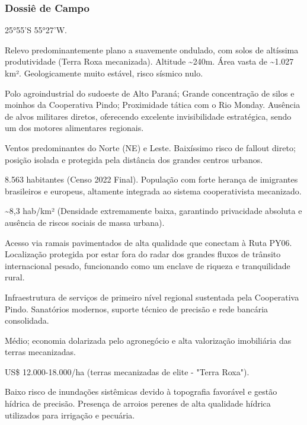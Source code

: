 \subsubsection{Dossiê de Campo}
\begin{description}[style=nextline,leftmargin=0.5cm,font=\bfseries]
\item[Coordenadas]  25°55'S 55°27'W.
\item[Topografia]  Relevo predominantemente plano a suavemente ondulado, com solos de altíssima produtividade (Terra Roxa mecanizada). Altitude \textasciitilde 240m. Área vasta de \textasciitilde 1.027 km². Geologicamente muito estável, risco sísmico nulo.
\item[Alvos Estratégicos]  Polo agroindustrial do sudoeste de Alto Paraná; Grande concentração de silos e moinhos da Cooperativa Pindo; Proximidade tática com o Rio Monday. Ausência de alvos militares diretos, oferecendo excelente invisibilidade estratégica, sendo um dos motores alimentares regionais.
\item[Fallout]  Ventos predominantes do Norte (NE) e Leste. Baixíssimo risco de fallout direto; posição isolada e protegida pela distância dos grandes centros urbanos.
\item[População]  8.563 habitantes (Censo 2022 Final). População com forte herança de imigrantes brasileiros e europeus, altamente integrada ao sistema cooperativista mecanizado.
\item[Densidade]  \textasciitilde 8,3 hab/\allowbreak km² (Densidade extremamente baixa, garantindo privacidade absoluta e ausência de riscos sociais de massa urbana).
\item[Vias de Acesso]  Acesso via ramais pavimentados de alta qualidade que conectam à Ruta PY06. Localização protegida por estar fora do radar dos grandes fluxos de trânsito internacional pesado, funcionando como um enclave de riqueza e tranquilidade rural.
\item[Serviços]  Infraestrutura de serviços de primeiro nível regional sustentada pela Cooperativa Pindo. Sanatórios modernos, suporte técnico de precisão e rede bancária consolidada.
\item[Custo de Vida]  Médio; economia dolarizada pelo agronegócio e alta valorização imobiliária das terras mecanizadas.
\item[Preço da Terra]  US\$ 12.000-18.000/\allowbreak ha (terras mecanizadas de elite - "Terra Roxa").
\item[Hidrologia]  Baixo risco de inundações sistêmicas devido à topografia favorável e gestão hídrica de precisão. Presença de arroios perenes de alta qualidade hídrica utilizados para irrigação e pecuária.

\end{description}
